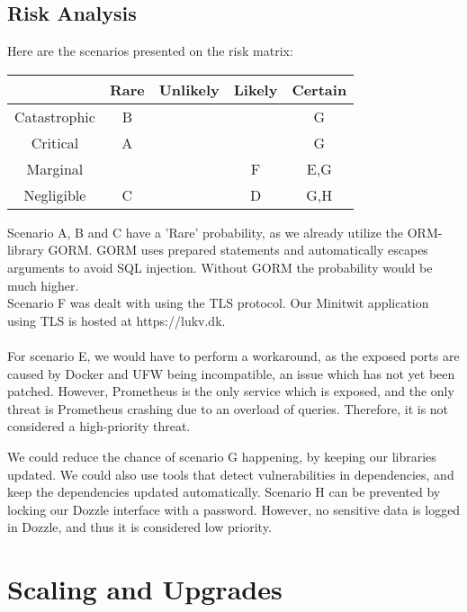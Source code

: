 \subsection{Risk Analysis}
Here are the scenarios presented on the risk matrix:
\begin{center}
\begin{tabular}{ |c|c|c|c|c| } 
 \hline
  & Rare & Unlikely & Likely & Certain \\ 
 \hline
 Catastrophic & B &  &  & G\\ 
 \hline
 Critical & A &  &  & G \\ 
 \hline
 Marginal & &  &  F& E,G\\ 
 \hline
 Negligible & C &  & D & G,H\\ 
 \hline
\end{tabular}
\end{center}
Scenario A, B and C have a 'Rare' probability, as we already utilize the ORM-library GORM. GORM uses prepared statements and automatically escapes arguments to avoid SQL injection. Without GORM the probability would be much higher.\\
Scenario F was dealt with using the TLS protocol. Our Minitwit application using TLS is hosted at https://lukv.dk.\\\\
For scenario E, we would have to perform a workaround, as the exposed ports are caused by Docker and UFW being incompatible, an issue which has not yet been patched. However, Prometheus is the only service which is exposed, and the only threat is Prometheus crashing due to an overload of queries. Therefore, it is not considered a high-priority threat.

We could reduce the chance of scenario G happening, by keeping our libraries updated. We could also use tools that detect vulnerabilities in dependencies, and keep the dependencies updated automatically. 
Scenario H can be prevented by locking our Dozzle interface with a password. However, no sensitive data is logged in Dozzle, and thus it is considered low priority.

\section{Scaling and Upgrades}
